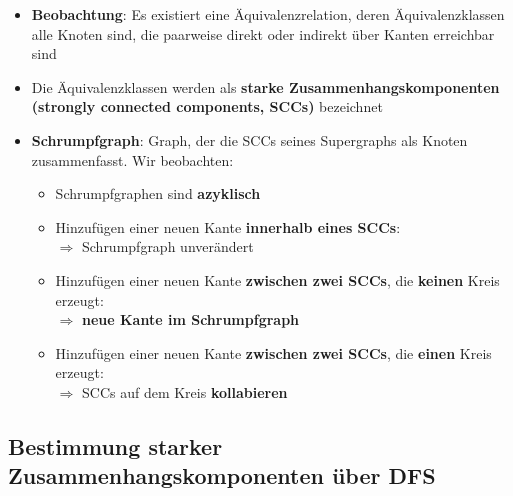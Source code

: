 \begin{itemize}
	\item \textbf{Beobachtung}: Es existiert eine Äquivalenzrelation, deren Äquivalenzklassen alle Knoten sind, die paarweise direkt oder indirekt über Kanten erreichbar sind
	\begin{center}
		\textit{}
	\end{center}
	\item Die Äquivalenzklassen werden als \textbf{starke Zusammenhangskomponenten (strongly connected components, SCCs)} bezeichnet
	\item \textbf{Schrumpfgraph}: Graph, der die SCCs seines Supergraphs als Knoten zusammenfasst. Wir beobachten:
	\begin{itemize}
		\item Schrumpfgraphen sind \textbf{azyklisch}
		\item Hinzufügen einer neuen Kante \textbf{innerhalb eines SCCs}:\\$\Rightarrow$ Schrumpfgraph unverändert
		\item Hinzufügen einer neuen Kante \textbf{zwischen zwei SCCs}, die \textbf{keinen} Kreis erzeugt:\\$\Rightarrow$ \textbf{neue Kante im Schrumpfgraph}
		\item Hinzufügen einer neuen Kante \textbf{zwischen zwei SCCs}, die \textbf{einen} Kreis erzeugt:\\$\Rightarrow$ SCCs auf dem Kreis \textbf{kollabieren}
	\end{itemize}
\end{itemize}

\subsection{Bestimmung starker Zusammenhangskomponenten über DFS}%
\label{dfs:sub:bestimmung_starker_zusammenhangskomponenten_ueber_dfs}

